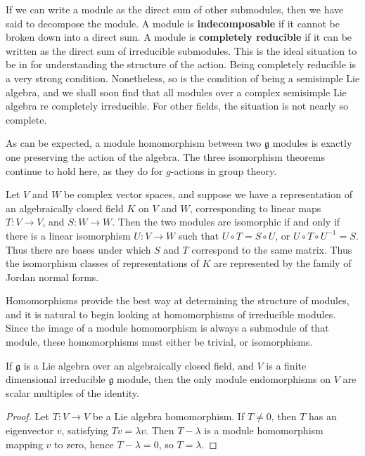 If we can write a module as the direct sum of other submodules, then we have said to decompose the module. A module is {\bf indecomposable} if it cannot be broken down into a direct sum. A module is {\bf completely reducible} if it can be written as the direct sum of irreducible submodules. This is the ideal situation to be in for understanding the structure of the action. Being completely reducible is a very strong condition. Nonetheless, so is the condition of being a semisimple Lie algebra, and we shall soon find that all modules over a complex semisimple Lie algebra re completely irreducible. For other fields, the situation is not nearly so complete.

As can be expected, a module homomorphism between two $\mathfrak{g}$ modules is exactly one preserving the action of the algebra. The three isomorphism theorems continue to hold here, as they do for $g$-actions in group theory.

\begin{example}
    Let $V$ and $W$ be complex vector spaces, and suppose we have a representation of an algebraically closed field $K$ on $V$ and $W$, corresponding to linear maps $T: V \to V$, and $S: W \to W$. Then the two modules are isomorphic if and only if there is a linear isomorphism $U: V \to W$ such that $U \circ T = S \circ U$, or $U \circ T \circ U^{-1} = S$. Thus there are bases under which $S$ and $T$ correspond to the same matrix. Thus the isomorphism classes of representations of $K$ are represented by the family of Jordan normal forms.
\end{example}

Homomorphisms provide the best way at determining the structure of modules, and it is natural to begin looking at homomorphisms of irreducible modules. Since the image of a module homomorphism is always a submodule of that module, these homomorphisms must either be trivial, or isomorphisms.

\begin{lemma}[Schur]
    If $\mathfrak{g}$ is a Lie algebra over an algebraically closed field, and $V$ is a finite dimensional irreducible $\mathfrak{g}$ module, then the only module endomorphisms on $V$ are scalar multiples of the identity.
\end{lemma}
\begin{proof}
    Let $T: V \to V$ be a Lie algebra homomorphism. If $T \neq 0$, then $T$ has an eigenvector $v$, satisfying $Tv = \lambda v$. Then $T - \lambda$ is a module homomorphism mapping $v$ to zero, hence $T - \lambda = 0$, so $T = \lambda$.
\end{proof}

